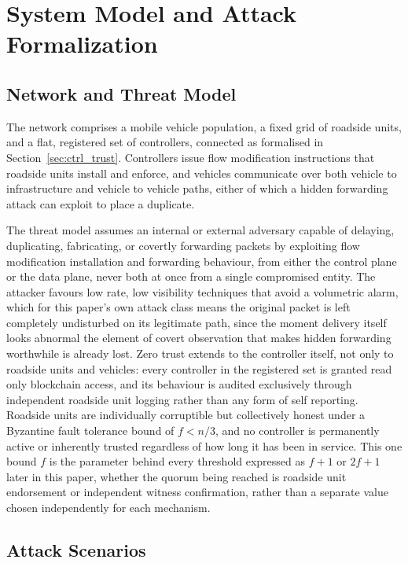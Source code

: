 \documentclass[final,5p,twocolumn]{elsarticle}
\theoremstyle{remark}
\theoremstyle{plain}
\begin{document}
\section{System Model and Attack Formalization}
\label{system_model}

\subsection{Network and Threat Model}
\label{sec:threat_model}

The network comprises a mobile vehicle population, a fixed grid of
roadside units, and a flat, registered set of controllers, connected as
formalised in Section~\ref{sec:ctrl_trust}. Controllers issue flow
modification instructions that roadside units install and enforce, and
vehicles communicate over both vehicle to infrastructure and vehicle to
vehicle paths, either of which a hidden forwarding attack can exploit to
place a duplicate.

The threat model assumes an internal or external adversary capable of
delaying, duplicating, fabricating, or covertly forwarding packets by
exploiting flow modification installation and forwarding behaviour, from
either the control plane or the data plane, never both at once from a
single compromised entity. The attacker favours low rate, low visibility
techniques that avoid a volumetric alarm, which for this paper's own
attack class means the original packet is left completely undisturbed on
its legitimate path, since the moment delivery itself looks abnormal the
element of covert observation that makes hidden forwarding worthwhile is
already lost. Zero trust extends to the controller itself, not only to
roadside units and vehicles: every controller in the registered set is
granted read only blockchain access, and its behaviour is audited
exclusively through independent roadside unit logging rather than any
form of self reporting. Roadside units are individually corruptible but
collectively honest under a Byzantine fault tolerance bound of $f<n/3$,
and no controller is permanently active or inherently trusted regardless
of how long it has been in service. This one bound $f$ is the parameter
behind every threshold expressed as $f{+}1$ or $2f{+}1$ later in this
paper, whether the quorum being reached is roadside unit endorsement or
independent witness confirmation, rather than a separate value chosen
independently for each mechanism.

\subsection{Attack Scenarios}
\label{sec:attack_scenarios}
\end{document}

